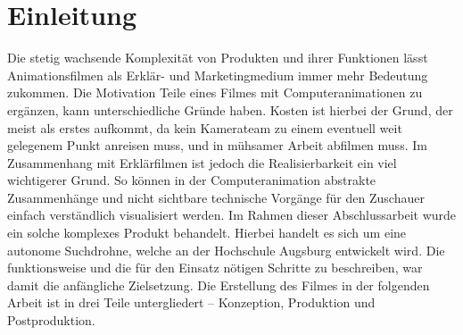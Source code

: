 \chapter{Einleitung}

Die stetig wachsende Komplexität von Produkten und ihrer Funktionen lässt Animationsfilmen als Erklär- und Marketingmedium immer mehr Bedeutung zukommen. Die Motivation Teile eines Filmes mit Computeranimationen zu ergänzen, kann unterschiedliche Gründe haben. Kosten ist hierbei der Grund, der meist als erstes aufkommt, da kein Kamerateam zu einem eventuell weit gelegenem Punkt anreisen muss, und in mühsamer Arbeit abfilmen muss. Im Zusammenhang mit Erklärfilmen ist jedoch die Realisierbarkeit ein viel wichtigerer Grund. So können in der Computeranimation abstrakte Zusammenhänge und nicht sichtbare technische Vorgänge für den Zuschauer einfach verständlich visualisiert werden. 
Im Rahmen dieser Abschlussarbeit wurde ein solche komplexes Produkt behandelt. Hierbei handelt es sich um eine autonome Suchdrohne, welche an der Hochschule Augsburg entwickelt wird. Die funktionsweise und die für den Einsatz nötigen Schritte zu beschreiben, war damit die anfängliche Zielsetzung.
Die Erstellung des Filmes in der folgenden Arbeit ist in drei Teile untergliedert -- Konzeption, Produktion und Postproduktion.